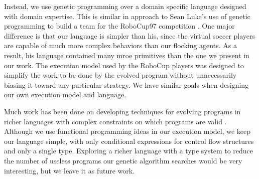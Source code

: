 Instead, we use genetic programming over a domain specific language designed
with domain expertise.
This is similar in approach to Sean Luke's use of genetic programming to build
a team for the RoboCup97 competition \cite{lukeRoboCup97}.
One major difference is that our language is simpler than his, since the
virtual soccer players are capable of much more complex behaviors than our
flocking agents.
As a result, his language contained many mroe primitives than the one we
present in our work.
The execution model used by the RoboCup players was designed to simplify the
work to be done by the evolved program without unnecessarily biasing it toward
any particular strategy.
We have similar goals when designing our own execution model and language.

Much work has been done on developing techniques for evolving programs in
richer languages with complex constraints on which programs are valid
\cite{BriggsGP}.
Although we use functional programming ideas in our execution model, we keep
our language simple, with only conditional expressions for control flow
structures and only a single type.
Exploring a richer language with a type system to reduce the number of useless
programs our genetic algorithm searches would be very interesting, but we leave
it as future work.

